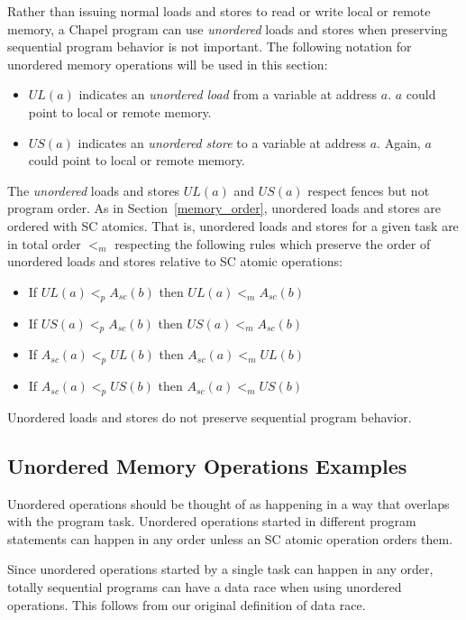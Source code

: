 Rather than issuing normal loads and stores to read or write local or
remote memory, a Chapel program can use \textit{unordered} loads and
stores when preserving sequential program behavior is not
important.  The following notation for unordered memory operations
will be used in this section:

\begin{itemize}

  \item $UL(a)$ indicates an \textit{unordered} \textit{load} from a
  variable at address $a$. $a$ could point to local or remote memory.

  \item $US(a)$ indicates an \textit{unordered} \textit{store} to a
  variable at address $a$. Again, $a$ could point to local or remote
  memory.

\end{itemize}

The \textit{unordered} loads and stores $UL(a)$ and $US(a)$ respect
fences but not program order. As in Section~\ref{memory_order},
unordered loads and stores are ordered with SC atomics.  That is,
unordered loads and stores for a given task are in total order $<_m$
respecting the following rules which preserve the order of unordered
loads and stores relative to SC atomic operations:

\begin{itemize}
  \item If $UL(a)<_pA_{sc}(b)$ then $UL(a)<_mA_{sc}(b)$
  \item If $US(a)<_pA_{sc}(b)$ then $US(a)<_mA_{sc}(b)$
  \item If $A_{sc}(a)<_pUL(b)$ then $A_{sc}(a)<_mUL(b)$
  \item If $A_{sc}(a)<_pUS(b)$ then $A_{sc}(a)<_mUS(b)$
\end{itemize}

Unordered loads and stores do not preserve sequential program behavior.

\subsection{Unordered Memory Operations Examples}

Unordered operations should be thought of as happening in a way that
overlaps with the program task. Unordered operations started in
different program statements can happen in any order unless an SC
atomic operation orders them.

Since unordered operations started by a single task can happen in any
order, totally sequential programs can have a data race when using
unordered operations. This follows from our original definition of
data race.

